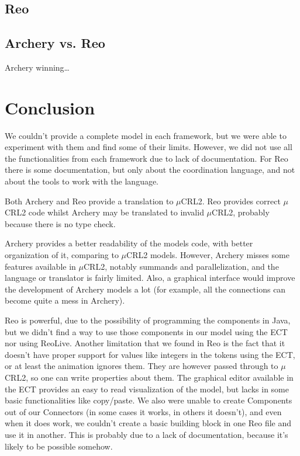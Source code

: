 \documentclass[a4paper]{article}
\newcommand{\ar}{Archery\xspace}
\newcommand{\re}{Reo\xspace}
\newcommand{\mcrl}{$\mu$CRL2\xspace}
\begin{document}
\subsection{\re}


\subsection{\ar vs. \re}

\ar winning\dots

%
%
\section{Conclusion}
We couldn't provide a complete model in each framework, but we were able to
experiment with them and find some of their limits. However, we did not use all the
functionalities from each framework due to lack of documentation. For \re there
is some documentation, but only about the coordination language, and not about
the tools to work with the language.

Both \ar and \re provide a translation to \mcrl. \re provides correct \mcrl
code whilst \ar may be translated to invalid \mcrl, probably because there is
no type check.

\ar provides a better readability of the models code, with better organization
of it, comparing to \mcrl models. However, \ar misses some features available
in \mcrl, notably summands and parallelization, and the language or translator is
fairly limited. Also, a graphical interface would improve the development of
\ar models a lot (for example, all the connections can become quite a mess in
\ar).


\re is powerful, due to the possibility of programming the components in Java,
but we didn't find a way to use those components in our model using the ECT nor
using ReoLive. Another limitation that we found in \re is the fact that it
doesn't have proper support for values like integers in the tokens using the
ECT, or at least the animation ignores them. They are however passed through to
\mcrl, so one can write properties about them. The graphical editor available in
the ECT provides an easy to read visualization of the model, but lacks in some
basic functionalities like copy/paste. We also were unable to create Components
out of our Connectors (in some cases it works, in others it doesn't), and even
when it does work, we couldn't create a basic building block in one \re file and
use it in another.  This is probably due to a lack of documentation, because
it's likely to be possible somehow.
\end{document}
